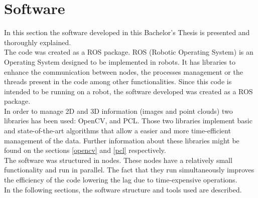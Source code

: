 \chapter{Software}
\label{software}
In this section the software developed in this Bachelor's Thesis is presented and thoroughly explained. 
\\

The code was created as a ROS package. ROS (Robotic Operating System) is an Operating System designed to be implemented in robots. It has libraries to enhance the communication between nodes, the processes management or the threads present in the code among other functionalities. 
Since this code is intended to be running on a robot, the software developed was created as a ROS package. 
\\

In order to manage 2D and 3D information (images and point clouds) two libraries has been used: OpenCV, and PCL. Those two libraries implement basic and state-of-the-art algorithms that allow a easier and more time-efficient management of the data. Further information about these libraries might be found on the sections \ref{opencv} and \ref{pcl} respectively. 
\\

The software was structured in nodes. These nodes have a relatively small functionality and run in parallel. The fact that they run simultaneously improves the efficiency of the code lowering the lag due to time-expensive operations. 
\\

In the following sections, the software structure and tools used are described. 

\newpage



\newpage

 
\newpage


\newpage


\newpage

